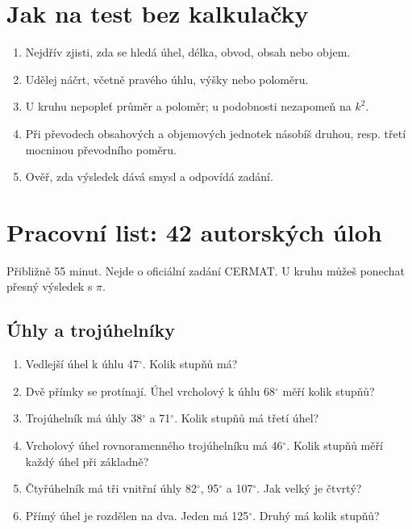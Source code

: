 \documentclass[11pt,a4paper]{article}
\begin{document}
\section{Jak na test bez kalkulačky}
\begin{enumerate}
\item Nejdřív zjisti, zda se hledá úhel, délka, obvod, obsah nebo objem.
\item Udělej náčrt, včetně pravého úhlu, výšky nebo poloměru.
\item U kruhu nepopleť průměr a poloměr; u podobnosti nezapomeň na \(k^2\).
\item Při převodech obsahových a objemových jednotek násobíš druhou, resp. třetí mocninou převodního poměru.
\item Ověř, zda výsledek dává smysl a odpovídá zadání.
\end{enumerate}
\Needspace{140pt}
\section{Pracovní list: 42 autorských úloh}
Přibližně 55 minut. Nejde o oficiální zadání CERMAT. U kruhu můžeš ponechat přesný výsledek s \(\pi\).

\subsection*{Úhly a trojúhelníky}
\begin{enumerate}[label=\arabic*.,start=1,leftmargin=*,itemsep=6pt]
\item Vedlejší úhel k úhlu 47$^\circ$. Kolik stupňů má?\par\vspace{2mm}
\item Dvě přímky se protínají. Úhel vrcholový k úhlu 68$^\circ$ měří kolik stupňů?\par\vspace{2mm}
\item Trojúhelník má úhly 38$^\circ$ a 71$^\circ$. Kolik stupňů má třetí úhel?\par\vspace{2mm}
\item Vrcholový úhel rovnoramenného trojúhelníku má 46$^\circ$. Kolik stupňů měří každý úhel při základně?\par\vspace{2mm}
\item Čtyřúhelník má tři vnitřní úhly 82$^\circ$, 95$^\circ$ a 107$^\circ$. Jak velký je čtvrtý?\par\vspace{2mm}
\item Přímý úhel je rozdělen na dva. Jeden má 125$^\circ$. Druhý má kolik stupňů?\par\vspace{2mm}
\end{enumerate}
\end{document}
